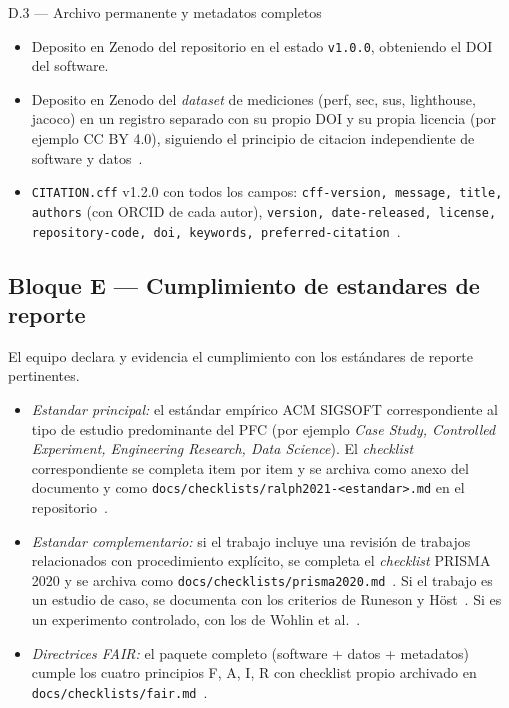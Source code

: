 \documentclass[11pt,a4paper]{article}
\begin{document}
\begin{cajarepo}{D.3 --- Archivo permanente y metadatos completos}
    \begin{itemize}
        \item Deposito en Zenodo del repositorio en el estado \texttt{v1.0.0}, obteniendo el DOI del software.
        \item Deposito en Zenodo del \emph{dataset} de mediciones (perf, sec, sus, lighthouse, jacoco) en un registro separado con su propio DOI y su propia licencia (por ejemplo CC BY 4.0), siguiendo el principio de citacion independiente de software y datos~\cite{smith2016software,druskat2021cff}.
        \item \texttt{CITATION.cff} v1.2.0 con todos los campos: \texttt{cff-version, message, title, authors} (con ORCID de cada autor), \texttt{version, date-released, license, repository-code, doi, keywords, preferred-citation}~\cite{druskat2021cff,haak2012orcid}.
    \end{itemize}
\end{cajarepo}

\subsection{Bloque E --- Cumplimiento de estandares de reporte}

El equipo declara y evidencia el cumplimiento con los est\'{a}ndares de reporte pertinentes.

\begin{itemize}
    \item \emph{Estandar principal:} el est\'{a}ndar emp\'{i}rico ACM SIGSOFT correspondiente al tipo de estudio predominante del PFC (por ejemplo \emph{Case Study, Controlled Experiment, Engineering Research, Data Science}). El \emph{checklist} correspondiente se completa item por item y se archiva como anexo del documento y como \texttt{docs/checklists/ralph2021-<estandar>.md} en el repositorio~\cite{ralph2021empirical}.
    \item \emph{Estandar complementario:} si el trabajo incluye una revisi\'{o}n de trabajos relacionados con procedimiento expl\'{i}cito, se completa el \emph{checklist} PRISMA 2020 y se archiva como \texttt{docs/checklists/prisma2020.md}~\cite{page2021prisma}. Si el trabajo es un estudio de caso, se documenta con los criterios de Runeson y H\"ost~\cite{runeson2009case}. Si es un experimento controlado, con los de Wohlin et al.~\cite{wohlin2012experimentation}.
    \item \emph{Directrices FAIR:} el paquete completo (software + datos + metadatos) cumple los cuatro principios F, A, I, R con checklist propio archivado en \texttt{docs/checklists/fair.md}~\cite{wilkinson2016fair}.
\end{itemize}
\end{document}
